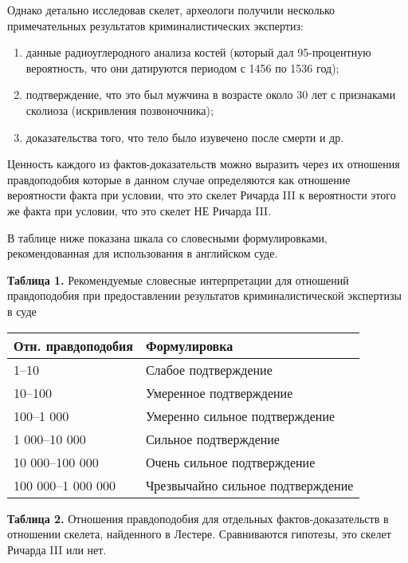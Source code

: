 \documentclass[11pt,a4paper]{article}
\providecommand{\tightlist}{%
      \setlength{\itemsep}{0pt}\setlength{\parskip}{0pt}}
\begin{document}
    Однако детально исследовав скелет, археологи получили несколько
примечательных результатов криминалистических экспертиз:

\begin{enumerate}
\def\labelenumi{\arabic{enumi}.}
\tightlist
\item
  данные радиоуглеродного анализа костей (который дал 95-процентную
  вероятность, что они датируются периодом с 1456 по 1536 год);
\item
  подтверждение, что это был мужчина в возрасте около 30 лет с
  признаками сколиоза (искривления позвоночника);
\item
  доказательства того, что тело было изувечено после смерти и др.
\end{enumerate}

Ценность каждого из фактов-доказательств можно выразить через их
отношения правдоподобия которые в данном случае определяются как
отношение вероятности факта при условии, что это скелет Ричарда III к
вероятности этого же факта при условии, что это скелет НЕ Ричарда III.

В таблице ниже показана шкала со словесными формулировками,
рекомендованная для использования в английском суде.

    \textbf{Таблица 1.} Рекомендуемые словесные интерпретации для отношений
правдоподобия при предоставлении результатов криминалистической
экспертизы в суде

\begin{longtable}[]{@{}ll@{}}
\toprule
Отн. правдоподобия & Формулировка \\
\midrule
\endhead
1--10 & Слабое подтверждение \\
10--100 & Умеренное подтверждение \\
100--1 000 & Умеренно сильное подтверждение \\
1 000--10 000 & Сильное подтверждение \\
10 000--100 000 & Очень сильное подтверждение \\
100 000--1 000 000 & Чрезвычайно сильное подтверждение \\
\bottomrule
\end{longtable}

    \textbf{Таблица 2.} Отношения правдоподобия для отдельных
фактов-доказательств в отношении скелета, найденного в Лестере.
Сравниваются гипотезы, это скелет Ричарда III или нет.
\end{document}
